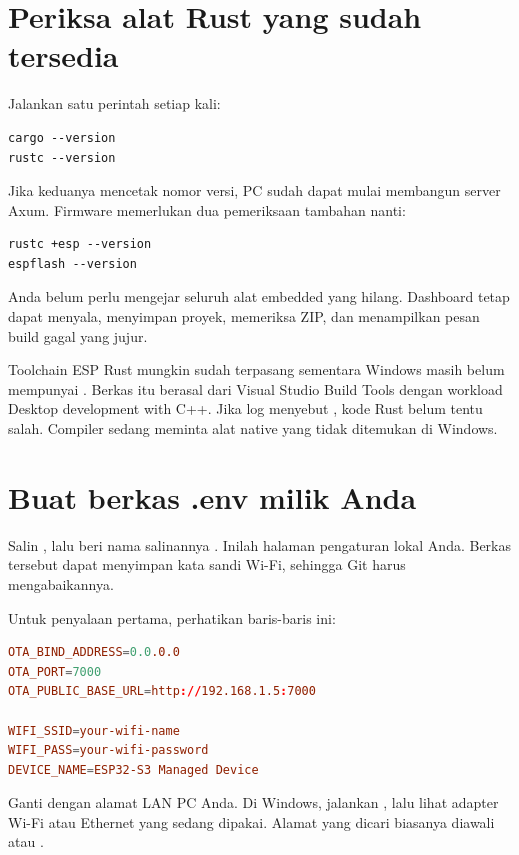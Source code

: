 \section{Periksa alat Rust yang sudah tersedia}

Jalankan satu perintah setiap kali:

\begin{lstlisting}
cargo --version
rustc --version
\end{lstlisting}

Jika keduanya mencetak nomor versi, PC sudah dapat mulai membangun server Axum. Firmware memerlukan dua pemeriksaan tambahan nanti:

\begin{lstlisting}
rustc +esp --version
espflash --version
\end{lstlisting}

Anda belum perlu mengejar seluruh alat embedded yang hilang. Dashboard tetap dapat menyala, menyimpan proyek, memeriksa ZIP, dan menampilkan pesan build gagal yang jujur.

\begin{mentorbox}
Toolchain ESP Rust mungkin sudah terpasang sementara Windows masih belum mempunyai . Berkas itu berasal dari Visual Studio Build Tools dengan workload Desktop development with C++. Jika log menyebut , kode Rust belum tentu salah. Compiler sedang meminta alat native yang tidak ditemukan di Windows.
\end{mentorbox}

\section{Buat berkas .env milik Anda}

Salin , lalu beri nama salinannya . Inilah halaman pengaturan lokal Anda. Berkas tersebut dapat menyimpan kata sandi Wi-Fi, sehingga Git harus mengabaikannya.

Untuk penyalaan pertama, perhatikan baris-baris ini:

\begin{lstlisting}[language=TOML,numbers=none]
OTA_BIND_ADDRESS=0.0.0.0
OTA_PORT=7000
OTA_PUBLIC_BASE_URL=http://192.168.1.5:7000

WIFI_SSID=your-wifi-name
WIFI_PASS=your-wifi-password
DEVICE_NAME=ESP32-S3 Managed Device
\end{lstlisting}

Ganti  dengan alamat LAN PC Anda. Di Windows, jalankan , lalu lihat adapter Wi-Fi atau Ethernet yang sedang dipakai. Alamat yang dicari biasanya diawali  atau .

